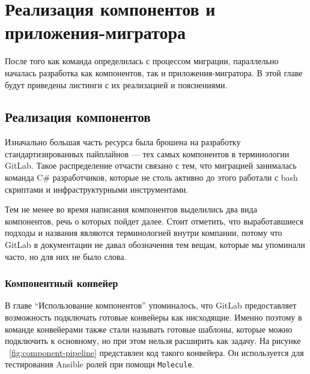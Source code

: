 \usepackage{csquotes}\chapter{Реализация компонентов и приложения-мигратора} \label{ch:ch3}
После того как команда определилась с процессом миграции, параллельно началась разработка как компонентов, так и приложения-мигратора.
В этой главе будут приведены листинги с их реализацией и пояснениями.

\section{Реализация компонентов} \label{sec:components-impl}
Изначально большая часть ресурса была брошена на разработку стандартизированных пайплайнов — тех самых компонентов в терминологии GitLab.
Такое распределение отчасти связано с тем, что миграцией занималась команда C\# разработчиков, которые не столь активно до этого работали
с bash скриптами\cite{bash} и инфраструктурными инструментами.

Тем не менее во время написания компонентов выделились два вида компонентов, речь о которых пойдет далее.
Стоит отметить, что выработавшиеся подходы и названия являются терминологией внутри компании,
потому что GitLab в документации не давал обозначения тем вещам, которые мы упоминали часто, но для них не было слова.

\subsection{Компонентный конвейер} \label{subsec:component-template}
В главе \enquote{Использование компонентов}\cite{subsec:component-usage} упоминалось,
что GitLab предоставляет возможность подключать готовые конвейеры как нисходящие.
Именно поэтому в команде конвейерами также стали называть готовые шаблоны, которые можно подключить
к основному, но при этом нельзя расширить как задачу.
На рисунке ~\ref{fig:component-pipeline} представлен код такого конвейера.
Он используется для тестирования Ansible ролей при помощи \texttt{Molecule}\cite{molecule}.

